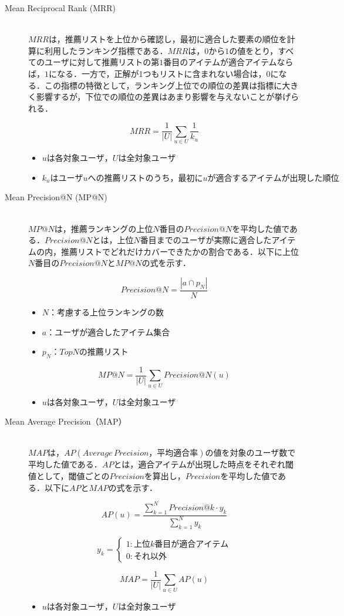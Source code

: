 \documentclass[12pt]{jarticle} %
\begin{document}
\begin{description}
\item[Mean Reciprocal Rank (MRR)]~\\
$MRR$は，推薦リストを上位から確認し，最初に適合した要素の順位を計算に利用したランキング指標である．$MRR$は，$0$から$1$の値をとり，すべてのユーザに対して推薦リストの第$1$番目のアイテムが適合アイテムならば，$1$になる．一方で，正解が1つもリストに含まれない場合は，$0$になる．この指標の特徴として，ランキング上位での順位の差異は指標に大きく影響するが，下位での順位の差異はあまり影響を与えないことが挙げられる．

\[
MRR =
\frac{1}{|U|}\sum_{u\in U} \frac{1}{k_u}
\]
\begin{itemize}
\item $uは各対象ユーザ，Uは全対象ユーザ$
\item $k_uはユーザuへの推薦リストのうち，最初にuが適合するアイテムが出現した順位$
\end{itemize}

\item[Mean Precision@N (MP@N)]~\\
$MP@N$は，推薦ランキングの上位$N$番目の$Precision@N$を平均した値である．$Precision@N$とは，上位$N$番目までのユーザが実際に適合したアイテムの内，推薦リストでどれだけカバーできたかの割合である．以下に上位$N$番目の$Precision@N$と$MP@N$の式を示す．

\[
Precision@N =
\frac{|a \cap p_N|}{N}
\]
\begin{itemize}
\item $N：考慮する上位ランキングの数$
\item $a：ユーザが適合したアイテム集合$
\item $p_N：TopNの推薦リスト$
\end{itemize}

\[
MP@N =
\frac{1}{|U|}\sum_{u\in U} Precision@N(u)
\]
\begin{itemize}
\item $uは各対象ユーザ，Uは全対象ユーザ$
\end{itemize}



\item[Mean Average Precision（MAP）]~\\
$MAP$は，$AP(Average\, Precision，平均適合率)$の値を対象のユーザ数で平均した値である．$AP$とは，適合アイテムが出現した時点をそれぞれ閾値として，閾値ごとの$Precision$を算出し，$Precision$を平均した値である．以下に$AP$と$MAP$の式を示す．

\[
AP(u) =
 \frac{\sum_{k=1}^{N} Precision@k \cdot y_k}{\sum_{k=1}^{N}y_k}
\]

\[
y_k = \begin{cases}
1 : 上位k番目が適合アイテム \\
0 : それ以外
\end{cases}
\]

\[
MAP =
\frac{1}{|U|}\sum_{u\in U} AP(u)
\]
\begin{itemize}
\item $uは各対象ユーザ，Uは全対象ユーザ$
\end{itemize}

\end{description}
\end{document}
